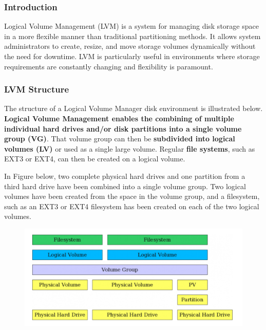 \documentclass{article}
\begin{document}
\subsubsection{Introduction}
Logical Volume Management (LVM) is a system for managing disk storage space in a more flexible manner than traditional partitioning methods. It allows system administrators to create, resize, and move storage volumes dynamically without the need for downtime. LVM is particularly useful in environments where storage requirements are constantly changing and flexibility is paramount.

\subsubsection{LVM Structure}
The structure of a Logical Volume Manager disk environment is illustrated below. \textbf{Logical Volume Management enables the combining of multiple individual hard drives and/or disk partitions into a single volume group (VG)}. That volume group can then be \textbf{subdivided into logical volumes (LV)} or used as a single large volume. Regular \textbf{file systems}, such as EXT3 or EXT4, can then be created on a logical volume.

In Figure below, two complete physical hard drives and one partition from a third hard drive have been combined into a single volume group. Two logical volumes have been created from the space in the volume group, and a filesystem, such as an EXT3 or EXT4 filesystem has been created on each of the two logical volumes.

\begin{figure}[H]
    \includegraphics[width=\textwidth]{pictures/pvs.png}
    \centering
\end{figure}
\end{document}
